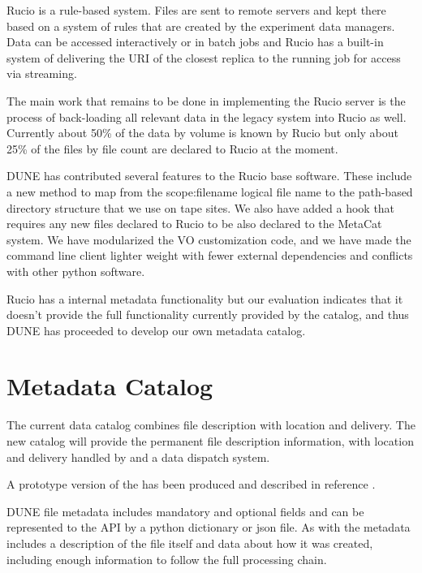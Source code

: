 \documentclass[../main-v1.tex]{subfiles}
\begin{document}
Rucio is a rule-based system.  Files are sent to remote servers and kept there based on a system of rules
that are created by the experiment data managers.  Data can be accessed interactively or in batch jobs and
Rucio has a built-in system of delivering the URI of the closest replica to the running job for access via streaming.

The main work that remains to be done in implementing the Rucio server is the process of back-loading all relevant 
data in the legacy  system into Rucio as well.  Currently about 50\% of the data by volume is known by Rucio but only about 25\% of the files by file count are declared to Rucio at the moment. 

DUNE has contributed several features to the Rucio base software.  These include a new method to map from the scope:filename logical file name to the path-based directory structure that we use on tape sites.  We also have added a hook that requires any new files declared to Rucio to be also declared to the MetaCat system.  We have modularized the VO customization code, and we have made the command line client lighter weight with fewer external dependencies and conflicts with other python software. 

Rucio has a internal metadata functionality but our evaluation indicates that it doesn't provide the full functionality currently provided by the  catalog, and thus DUNE has proceeded to develop our own metadata catalog. 

\section{Metadata Catalog }

The current  data catalog combines file description with location and delivery.  The new  catalog will provide the permanent file description information, with location and delivery handled by  and a data dispatch system. 

A prototype version of the  has been produced and described in reference \cite{Mandrichenko:2021spd}. 

DUNE file metadata includes mandatory and optional fields and can be represented to the API by a python dictionary or json file. 
As with  the metadata includes a description of the file itself and data about how it was created, including enough information to follow the full processing chain.   
\end{document}
